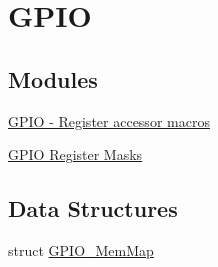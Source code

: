 \hypertarget{group___g_p_i_o___peripheral}{}\section{G\+P\+I\+O}
\label{group___g_p_i_o___peripheral}
\subsection*{Modules}
\begin{DoxyCompactItemize}
\item 
\hyperlink{group___g_p_i_o___register___accessor___macros}{G\+P\+I\+O -\/ Register accessor macros}
\item 
\hyperlink{group___g_p_i_o___register___masks}{G\+P\+I\+O Register Masks}
\end{DoxyCompactItemize}
\subsection*{Data Structures}
\begin{DoxyCompactItemize}
\item 
struct \hyperlink{struct_g_p_i_o___mem_map}{G\+P\+I\+O\+\_\+\+Mem\+Map}
\end{DoxyCompactItemize}
